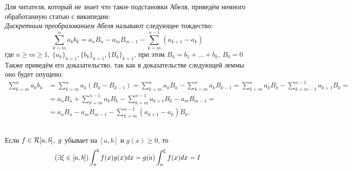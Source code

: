 \begin{anote}
	Для читателя, который не знает что такое подстановки Абеля, приведём немного обработанную статью с википедии:\\
	\textit{Дискретным преобразованием Абеля} называют следующее тождество:
	\[\sum_{k=m}^na_kb_k=a_nB_n-a_mB_{m-1}-\sum_{k=m}^{n-1}(a_{k+1}-a_k)\]
	где $n\ge m\ge 1,\ \{a_k\}_{k=1},\{b_k\}_{k=1},\{B_k\}_{k=1}$, при этом $B_k=b_1+\dots+b_k,\ B_0=0$\\
	Также приведём его доказательство, так как в доказательстве следующей леммы оно будет опущено:
	\begin{equation*}
		\begin{split}
			\sum_{k=m}^n a_kb_k &=\sum_{k=m}^n a_k(B_k-B_{k-1})=\sum_{k=m}^n a_k B_k - \sum_{k=m}^n a_kB_{k-1}=\sum_{k=m}^n a_k B_k - \sum_{k=m-1}^{n-1} a_{k+1} B_k = \\
			&= a_n B_n + \sum_{k=m}^{n-1} a_k B_k - \sum_{k=m}^{n-1} a_{k+1} B_k - a_m B_{m-1} = \\
			&= a_n B_n - a_m B_{m-1} - \sum_{k=m}^{n-1}(a_{k+1} - a_k) B_k,
		\end{split}
	\end{equation*}
\end{anote}
\begin{lemma}\label{10_le1}\\
	Если $f\in\mathcal R[a,b],\ g$ убывает на $[a,b]$ и $g(x)\ge0$, то
	\[(\exists\xi\in[a,b])\int_a^bf(x)g(x)dx=g(a)\int_a^\xi f(x)dx=I\]
\end{lemma}
